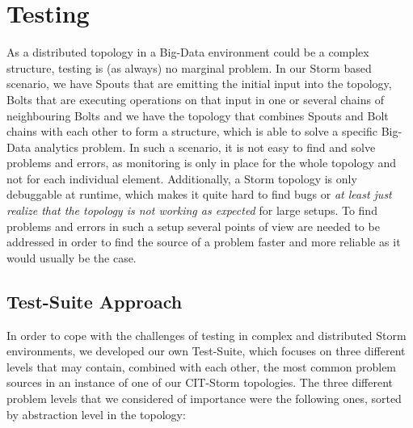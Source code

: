 \section{Testing}
\label{sect:testing}

	As a distributed topology in a Big-Data environment could be a complex structure, testing is (as always) no marginal problem. In our Storm based scenario, we have Spouts that are emitting the initial input into the topology, Bolts that are executing operations on that input in one or several chains of neighbouring Bolts and we have the topology that combines Spouts and Bolt chains with each other to form a structure, which is able to solve a specific Big-Data analytics problem. 
	In such a scenario, it is not easy to find and solve problems and errors, as monitoring is only in place for the whole topology and not for each individual element. Additionally, a Storm topology is only debuggable at runtime, which makes it quite hard to find bugs or \textit{at least just realize that the topology is not working as expected} for large setups. 
	To find problems and errors in such a setup several points of view are needed to be addressed in order to find the source of a problem faster and more reliable as it would usually be the case.
	
\subsection{Test-Suite Approach}
	In order to cope with the challenges of testing in complex and distributed Storm environments, we developed our own Test-Suite, which focuses on three different levels that may contain, combined with each other, the most common problem sources in an instance of one of our CIT-Storm topologies. The three different problem levels that we considered of importance were the following ones, sorted by abstraction level in the topology:
	
